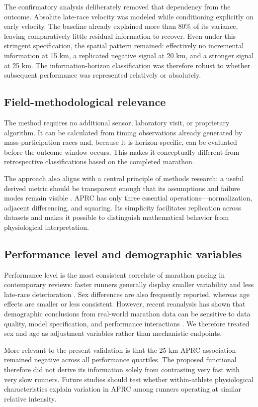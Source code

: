 \documentclass[pdflatex,sn-basic]{sn-jnl}
\begin{document}
The confirmatory analysis deliberately removed that dependency from the outcome. Absolute late-race velocity was modeled while conditioning explicitly on early velocity. The baseline already explained more than 80\% of its variance, leaving comparatively little residual information to recover. Even under this stringent specification, the spatial pattern remained: effectively no incremental information at 15 km, a replicated negative signal at 20 km, and a stronger signal at 25 km. The information-horizon classification was therefore robust to whether subsequent performance was represented relatively or absolutely.

\subsection{Field-methodological relevance}
The method requires no additional sensor, laboratory visit, or proprietary algorithm. It can be calculated from timing observations already generated by mass-participation races and, because it is horizon-specific, can be evaluated before the outcome window occurs. This makes it conceptually different from retrospective classifications based on the completed marathon.

The approach also aligns with a central principle of methods research: a useful derived metric should be transparent enough that its assumptions and failure modes remain visible \citep{Westerblad2025}. APRC has only three essential operations---normalization, adjacent differencing, and squaring. Its simplicity facilitates replication across datasets and makes it possible to distinguish mathematical behavior from physiological interpretation.

\subsection{Performance level and demographic variables}
Performance level is the most consistent correlate of marathon pacing in contemporary reviews: faster runners generally display smaller variability and less late-race deterioration \citep{Sha2024}. Sex differences are also frequently reported, whereas age effects are smaller or less consistent. However, recent reanalysis has shown that demographic conclusions from real-world marathon data can be sensitive to data quality, model specification, and performance interactions . We therefore treated sex and age as adjustment variables rather than mechanistic endpoints.

More relevant to the present validation is that the 25-km APRC association remained negative across all performance quartiles. The proposed functional therefore did not derive its information solely from contrasting very fast with very slow runners. Future studies should test whether within-athlete physiological characteristics explain variation in APRC among runners operating at similar relative intensity.
\end{document}
